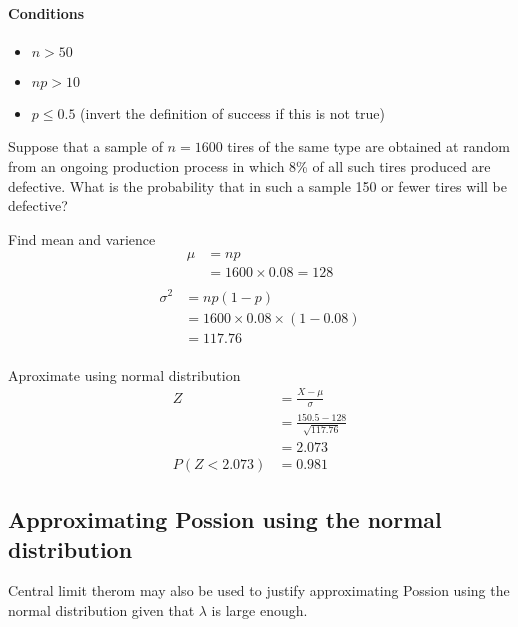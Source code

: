         \paragraph{Conditions}
        \begin{itemize}
            \item $n > 50$
            \item $np > 10$
            \item $p \leq 0.5$ (invert the definition of success if this is not true)
        \end{itemize}

        \begin{example}
        {
        Suppose that a sample of $n = 1600$ tires of the same type are obtained at random from an ongoing production process in which 8\% of all such tires produced are defective. What is the probability that in such a sample 150 or fewer tires will be defective?
        }

        \begin{step}{Find mean and varience}
        \begin{align*}
        \mu &= np\\
        &= 1600 \times 0.08 = 128\\
        \end{align*}
        \begin{align*}
        \sigma^2 &= np(1-p)\\
        &= 1600 \times 0.08 \times (1 - 0.08)\\
        &= 117.76\\
        \end{align*}
        \end{step}

        \begin{step}{Aproximate using normal distribution}
        \begin{align*}
        Z &= \frac{X - \mu}{\sigma} \\
        &= \frac{150.5 - 128}{\sqrt{117.76}}\\
        &= 2.073\\
        P(Z < 2.073) &= 0.981
        \end{align*}
        \end{step}

        \end{example}


    \subsection{Approximating Possion using the normal distribution}
        Central limit therom may also be used to justify approximating Possion using the normal distribution given that $\lambda$ is large enough.

